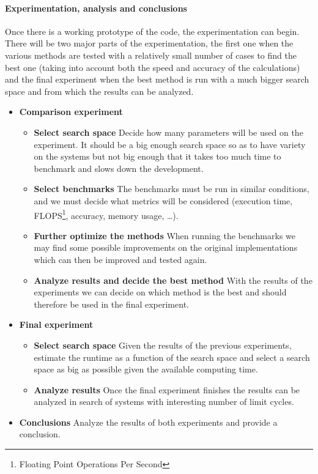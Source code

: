 \paragraph{Experimentation, analysis and conclusions}

Once there is a working prototype of the code, the experimentation can begin.
There will be two major parts of the experimentation, the first one when the
various methods are tested with a relatively small number of cases to find the
best one (taking into account both the speed and accuracy of the calculations)
and the final experiment when the best method is run with a much bigger search
space and from which the results can be analyzed.

\begin{itemize}
    \item \textbf{Comparison experiment}
        \begin{itemize}
            \item \textbf{Select search space} Decide how many
                parameters will be used on the experiment. It should be a big
                enough search space so as to have variety on the systems but not
                big enough that it takes too much time to benchmark and slows
                down the development.
            \item \textbf{Select benchmarks} The benchmarks must be run in
                similar conditions, and we must decide what metrics will be
                considered (execution time, FLOPS\footnote{Floating Point Operations
                Per Second}, accuracy, memory usage, \dots).
            \item \textbf{Further optimize the methods} When running the
                benchmarks we may find some possible improvements on the
                original implementations which can then be improved and tested
                again.
            \item \textbf{Analyze results and decide the best method} With the
                results of the experiments we can decide on which method is the
                best and should therefore be used in the final experiment.
        \end{itemize}
    \item \textbf{Final experiment}
        \begin{itemize}
            \item \textbf{Select search space} Given the results of the previous
                experiments, estimate the runtime as a function of the search
                space and select a search space as big as possible given the
                available computing time.
            \item \textbf{Analyze results} Once the final experiment finishes
                the results can be analyzed in search of systems with
                interesting number of limit cycles.
        \end{itemize}
    \item \textbf{Conclusions} Analyze the results of both experiments and
        provide a conclusion.
\end{itemize}

